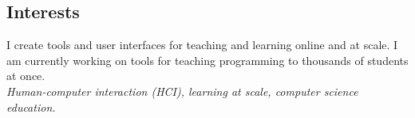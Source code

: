 \documentclass[margin]{res}
\begin{document}
 

 
\address{32 Vassar Street, Rm 32-G707\\Cambridge, MA 02139}
\address{ELG@MIT.edu\\
(215) 694-9631} 

 
\begin{resume} 
 
\section{Interests} 
I create tools and user interfaces for teaching and learning online and at scale. I am currently working on tools for teaching programming to thousands of students at once.\\
{\it Human-computer interaction (HCI), learning at scale, computer science education.}






\end{resume}
\end{document}
